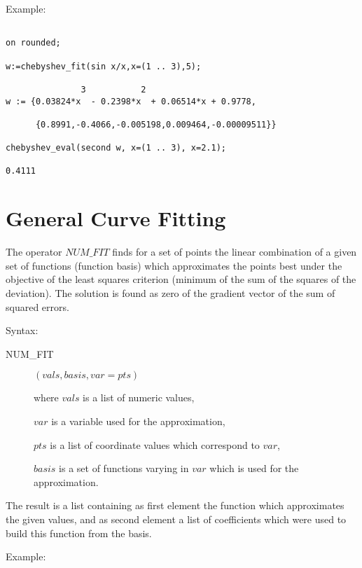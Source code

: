 Example:

\begin{verbatim}

on rounded;

w:=chebyshev_fit(sin x/x,x=(1 .. 3),5);

               3           2
w := {0.03824*x  - 0.2398*x  + 0.06514*x + 0.9778,

      {0.8991,-0.4066,-0.005198,0.009464,-0.00009511}}

chebyshev_eval(second w, x=(1 .. 3), x=2.1);

0.4111

\end{verbatim}

\section{General Curve Fitting}

The operator $NUM\_FIT$ finds for a set of
points the linear combination of a given set of
functions (function basis) which approximates the
points best under the objective of the least squares
criterion (minimum of the sum of the squares of the deviation).
The solution is found as zero of the
gradient vector of the sum of squared errors.

Syntax:

\begin{description}
\item[NUM\_FIT] $(vals,basis,var=pts)$

where $vals$ is a list of numeric values,

$var$ is a variable used for the approximation,

$pts$ is a list of coordinate values which correspond to $var$,

$basis$ is a set of functions varying in $var$ which is used
  for the approximation.

\end{description}

The result is a list containing as first element the
function which approximates the given values, and as
second element a list of coefficients which were used
to build this function from the basis.

Example:

